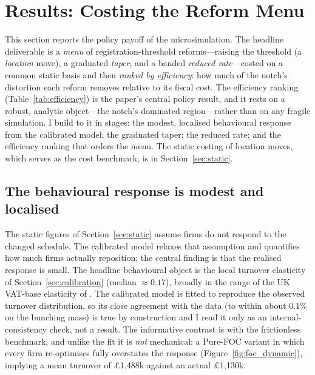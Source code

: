 \section{Results: Costing the Reform Menu}
\label{sec:results}

This section reports the policy payoff of the microsimulation. The headline
deliverable is a \emph{menu} of registration-threshold reforms---raising the
threshold (a \emph{location} move), a graduated \emph{taper}, and a banded
\emph{reduced rate}---costed on a common static basis and then \emph{ranked by
efficiency}: how much of the notch's distortion each reform removes relative to
its fiscal cost. The efficiency ranking (Table~\ref{tab:efficiency}) is the
paper's central policy result, and it rests on a robust, analytic object---the
notch's dominated region---rather than on any fragile simulation. I build to it
in stages: the modest, localised behavioural response from the calibrated model;
the graduated taper; the reduced rate; and the efficiency ranking that orders the
menu. The static costing of location moves, which serves as the cost benchmark, is
in Section~\ref{sec:static}.



\subsection{The behavioural response is modest and localised}
\label{sec:results_structural}

The static figures of Section~\ref{sec:static} assume firms do not respond to the changed schedule. The
calibrated model relaxes that assumption and quantifies how much firms actually
reposition; the central finding is that the realised response is small. The
headline behavioural object is the local turnover elasticity of
Section~\ref{sec:calibration} (median $\approx 0.17$), broadly in the range of the
UK VAT-base elasticity of \citet{liuetal2021}. The calibrated model is fitted to
reproduce the observed turnover distribution, so its close agreement with the data
(to within about $0.1\%$ on the bunching mass) is true by construction and I read
it only as an internal-consistency check, not a result. The informative contrast
is with the frictionless benchmark, and unlike the fit it is \emph{not}
mechanical: a Pure-FOC variant in which every firm re-optimises fully overstates
the response (Figure~\ref{fig:foc_dynamic}), implying a mean turnover of
\pounds1{,}488k against an actual \pounds1{,}130k.

